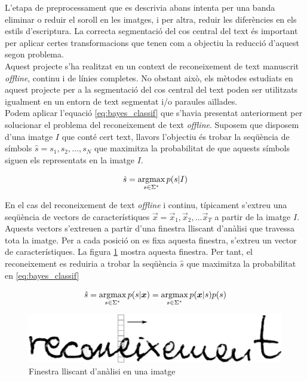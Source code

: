 L'etapa de preprocessament que es descrivia abans intenta per una banda eliminar o reduir el soroll en les imatges, i per altra, reduir les diferències en els estils d'escriptura. La correcta segmentació del cos central del text és important per aplicar certes transformacions que tenen com a objectiu la reducció d'aquest segon problema.\\

Aquest projecte s'ha realitzat en un context de reconeixement de text manuscrit \emph{offline}, continu i de línies completes. No obstant això, els mètodes estudiats en aquest projecte per a la segmentació del cos central del text poden ser utilitzats igualment en un entorn de text segmentat i/o paraules aïllades.\\

Podem aplicar l'equació \ref{eq:bayes_classif} que s'havia presentat anteriorment per solucionar el problema del reconeixement de text \emph{offline}. Suposem que disposem d'una imatge $I$ que conté cert text, llavors l'objectiu és trobar la seqüència de símbols $\hat{s} = s_1, s_2, \ldots, s_N$ que maximitza la probabilitat de que aquests símbols siguen els representats en la imatge $I$.

\begin{equation}\label{eq:}
\hat{s} = \operatorname*{argmax}_{s \in \Sigma^*} p(s|I)
\end{equation}

En el cas del reconeixement de text \emph{offline} i continu, típicament s'extreu una seqüència de vectors de característiques $\vec{x} = \vec{x}_1, \vec{x}_2, \ldots \vec{x}_T$ a partir de la imatge $I$. Aquests vectors s'extreuen a partir d'una finestra lliscant d'anàlisi que travessa tota la imatge. Per a cada posició on es fixa aquesta finestra, s'extreu un vector de característiques. La figura \ref{fig:finestra_lliscant} mostra aquesta finestra. Per tant, el reconeixement es reduiria a trobar la seqüència $\hat{s}$ que maximitza la probabilitat en  \ref{eq:bayes_classif}

\begin{equation}\label{eq:bayes_classif_vectors}
\hat{s} = \argmax_{s \in \Sigma^*} p(s|\vec{x}) = \argmax_{s \in \Sigma^*} p(\vec{x}|s) p(s) %
\end{equation}

\begin{figure}
\centering
\includegraphics[width=\textwidth]{images/finestra_lliscant.eps}
\caption{Finestra lliscant d'anàlisi en una imatge}
\label{fig:finestra_lliscant}
\end{figure}

